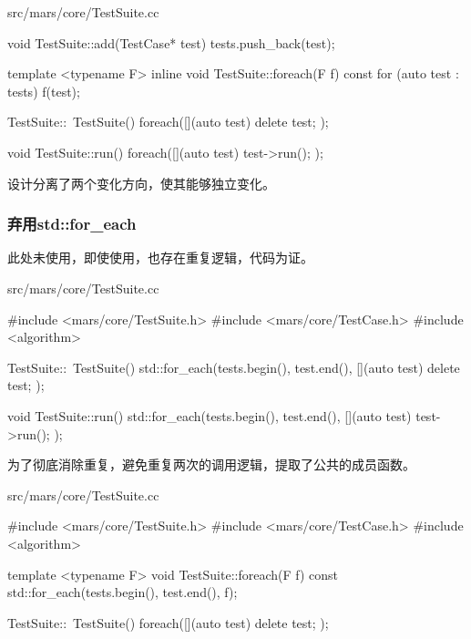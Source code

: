 \begin{content}
\begin{diff}{src/mars/core/TestSuite.cc}
\begin{minicpp}
void TestSuite::add(TestCase* test) {
  tests.push_back(test);
}

template <typename F>
inline void TestSuite::foreach(F f) const {
  for (auto test : tests) {
    f(test);
  }
}

TestSuite::~TestSuite() {
  foreach([](auto test) {
    delete test;
  });
}

void TestSuite::run() {
  foreach([](auto test) {
    test->run();
  });
}
 \end{minicpp}
\end{diff}

设计分离了两个变化方向，使其能够独立变化。

\begin{enum}
\end{enum}

\subsubsection{弃用std::for\_each}

此处未使用，即使使用，也存在重复逻辑，代码为证。

\begin{nodiff}{src/mars/core/TestSuite.cc}
 \begin{c++}
#include <mars/core/TestSuite.h>
#include <mars/core/TestCase.h>
#include <algorithm>

TestSuite::~TestSuite() {
  std::for_each(tests.begin(), test.end(), [](auto test){
    delete test;
  });
}

void TestSuite::run() {
  std::for_each(tests.begin(), test.end(), [](auto test){
    test->run();
  });
}
 \end{c++}
\end{nodiff}

为了彻底消除重复，避免重复两次的调用逻辑，提取了公共的成员函数。

\begin{nodiff}{src/mars/core/TestSuite.cc}
 \begin{c++}
#include <mars/core/TestSuite.h>
#include <mars/core/TestCase.h>
#include <algorithm>

template <typename F>
void TestSuite::foreach(F f) const {
  std::for_each(tests.begin(), test.end(), f);
}

TestSuite::~TestSuite() {
  foreach([](auto test){
    delete test;
  });
}


\end{c++}
\end{nodiff}
\end{content}
